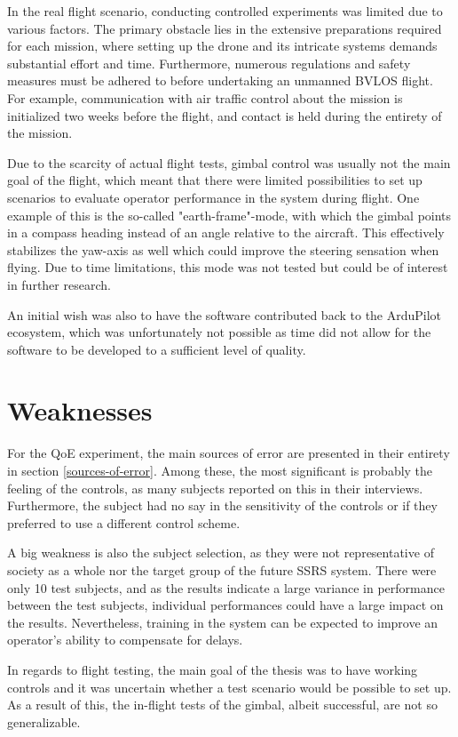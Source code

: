 \documentclass[nofilelist]{cslthse-msc}
\begin{document}
In the real flight scenario, conducting controlled experiments was limited due to various factors. The primary obstacle lies in the extensive preparations required for each mission, where setting up the drone and its intricate systems demands substantial effort and time. Furthermore, numerous regulations and safety measures must be adhered to before undertaking an unmanned BVLOS flight. For example, communication with air traffic control about the mission is initialized two weeks before the flight, and contact is held during the entirety of the mission.

Due to the scarcity of actual flight tests, gimbal control was usually not the main goal of the flight, which meant that there were limited possibilities to set up scenarios to evaluate operator performance in the system during flight. One example of this is the so-called "earth-frame"-mode, with which the gimbal points in a compass heading instead of an angle relative to the aircraft. This effectively stabilizes the yaw-axis as well which could improve the steering sensation when flying. Due to time limitations, this mode was not tested but could be of interest in further research.

An initial wish was also to have the software contributed back to the ArduPilot ecosystem, which was unfortunately not possible as time did not allow for the software to be developed to a sufficient level of quality.

\section{Weaknesses}
For the QoE experiment, the main sources of error are presented in their entirety in section \ref{sources-of-error}. Among these, the most significant is probably the feeling of the controls, as many subjects reported on this in their interviews. Furthermore, the subject had no say in the sensitivity of the controls or if they preferred to use a different control scheme.

A big weakness is also the subject selection, as they were not representative of society as a whole nor the target group of the future SSRS system. There were only 10 test subjects, and as the results indicate a large variance in performance between the test subjects, individual performances could have a large impact on the results. Nevertheless, training in the system can be expected to improve an operator's ability to compensate for delays. 

In regards to flight testing, the main goal of the thesis was to have working controls and it was uncertain whether a test scenario would be possible to set up. As a result of this, the in-flight tests of the gimbal, albeit successful, are not so generalizable. 
\end{document}
